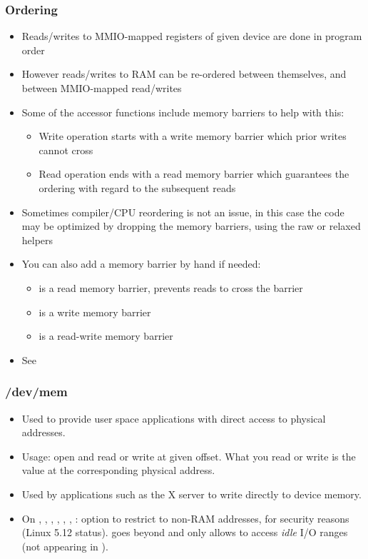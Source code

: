 \begin{frame}[fragile]
  \frametitle{Ordering}
  \begin{itemize}
  \item Reads/writes to MMIO-mapped registers of given device are done
    in program order
  \item However reads/writes to RAM can be re-ordered between
    themselves, and between MMIO-mapped read/writes
  \item Some of the accessor functions include memory barriers to help
    with this:
    \begin{itemize}
    \item Write operation starts with a write memory barrier which prior
      writes cannot cross
    \item Read operation ends with a read memory barrier which
      guarantees the ordering with regard to the subsequent reads
    \end{itemize}
  \item Sometimes compiler/CPU reordering is not an issue, in this case
    the code may be optimized by dropping the memory barriers, using the
    raw or relaxed helpers
  \item You can also add a memory barrier by hand if needed:
    \begin{itemize}
    \item {} is a read memory barrier, prevents reads to cross the barrier
    \item {} is a write memory barrier
    \item {} is a read-write memory barrier
    \end{itemize}
  \item See 
  \end{itemize}
\end{frame}

\begin{frame}
  \frametitle{/dev/mem}
  \begin{itemize}
  \item Used to provide user space applications with direct access to
    physical addresses.
  \item Usage: open  and read or write at given offset.
    What you read or write is the value at the corresponding physical
    address.
  \item Used by applications such as the X server to write directly to
    device memory.
  \item On , , , ,
    , , :
     option to restrict 
    to non-RAM addresses, for security reasons (Linux 5.12 status).
     goes beyond and only allows to access
    {\em idle} I/O ranges (not appearing in ).
\end{itemize}
\end{frame}

